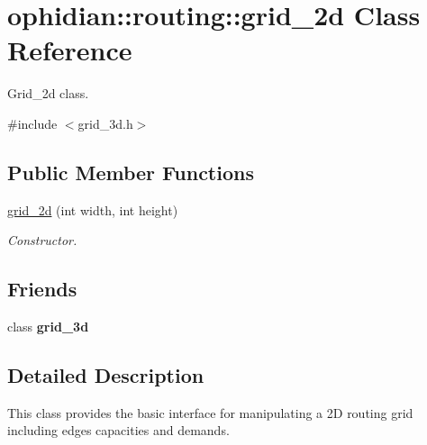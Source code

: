 \hypertarget{classophidian_1_1routing_1_1grid__2d}{\section{ophidian\-:\-:routing\-:\-:grid\-\_\-2d Class Reference}
\label{classophidian_1_1routing_1_1grid__2d}
}


Grid\-\_\-2d class.  




{\ttfamily \#include $<$grid\-\_\-3d.\-h$>$}

\subsection*{Public Member Functions}
\begin{DoxyCompactItemize}
\item 
\hyperlink{classophidian_1_1routing_1_1grid__2d_a4694c1bf84b4b8d2f6a4d05cc45f183a}{grid\-\_\-2d} (int width, int height)
\begin{DoxyCompactList}\small\item\em Constructor. \end{DoxyCompactList}\end{DoxyCompactItemize}
\subsection*{Friends}
\begin{DoxyCompactItemize}
\item 
\hypertarget{classophidian_1_1routing_1_1grid__2d_a43e9e3a53bb05bd1773d71ca8065b38a}{class {\bfseries grid\-\_\-3d}}\label{classophidian_1_1routing_1_1grid__2d_a43e9e3a53bb05bd1773d71ca8065b38a}

\end{DoxyCompactItemize}


\subsection{Detailed Description}
This class provides the basic interface for manipulating a 2\-D routing grid including edges capacities and demands. 


